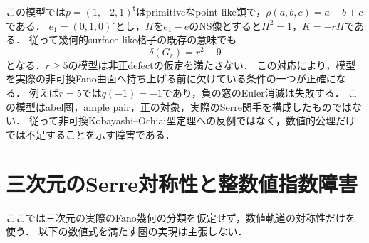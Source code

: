 \documentclass[11pt,a4paper]{ltjsarticle}
\begin{document}
この模型では$p=(1,-2,1)^{\mathsf t}$はprimitiveなpoint-like類で，$\rho(a,b,c)=a+b+c$である．
$e_1=(0,1,0)^{\mathsf t}$とし，$H$を$e_1-e$のNS像とすると$H^2=1$，$K=-rH$である．
従って幾何的surface-like格子の既存の意味でも
\[
 \delta(G_r)=r^2-9
\]
となる．$r\ge5$の模型は非正defectの仮定を満たさない．
この対応により，模型を実際の非可換Fano曲面へ持ち上げる前に欠けている条件の一つが正確になる．
例えば$r=5$では$q(-1)=-1$であり，負の窓のEuler消滅は失敗する．
この模型はabel圏，ample pair，正の対象，実際のSerre関手を構成したものではない．
従って非可換Kobayashi--Ochiai型定理への反例ではなく，数値的公理だけでは不足することを示す障害である．

\section{三次元のSerre対称性と整数値指数障害}\label{sec:threefold}
ここでは三次元の実際のFano幾何の分類を仮定せず，数値軌道の対称性だけを使う．
以下の数値式を満たす圏の実現は主張しない．
\end{document}
